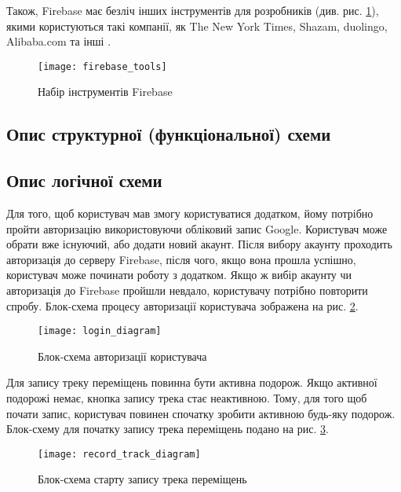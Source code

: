 \documentclass[../main.tex]{subfiles}
\begin{document}

Також, Firebase має безліч інших інструментів для розробників (див. рис. \ref{figure:firebase_tools}), якими користуються такі компанії, як The New York Times, Shazam, duolingo, Alibaba.com та інші \cite{firebase}.


\begin{figure}[H]
	\centering
	\texttt{[image: firebase\_tools]}
	\caption{Набір інструментів Firebase}
	\label{figure:firebase_tools}
\end{figure}

\subsection{Опис структурної (функціональної) схеми}


\subsection{Опис логічної схеми}
Для того, щоб користувач мав змогу користуватися додатком, йому потрібно пройти авторизацію використовуючи обліковий запис Google. Користувач може обрати вже існуючий, або додати новий акаунт. Після вибору акаунту проходить авторизація до серверу Firebase, після чого, якщо вона прошла успішно, користувач може починати роботу з додатком. Якщо ж вибір акаунту чи авторизація до Firebase пройшли невдало, користувачу потрібно повторити спробу. Блок-схема процесу авторизації користувача зображена на рис. \ref{diagram:login}.

\begin{figure}[H]
	\centering
	\texttt{[image: login\_diagram]}
	\caption{Блок-схема авторизації користувача}
	\label{diagram:login}
\end{figure}

Для запису треку переміщень повинна бути активна подорож. Якщо активної подорожі немає, кнопка запису трека стає неактивною. Тому, для того щоб почати запис, користувач повинен спочатку зробити активною будь-яку подорож. Блок-схему для початку запису трека переміщень подано на рис. \ref{diagram:start_tracking}.

\begin{figure}[H]
	\centering
	\texttt{[image: record\_track\_diagram]}
	\caption{Блок-схема старту запису трека переміщень}
	\label{diagram:start_tracking}
\end{figure}
\end{document}
